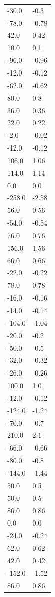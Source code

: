 \begin{longtable}{ll}
-30.0 & -0.3 \\
-78.0 & -0.78 \\
42.0 & 0.42 \\
10.0 & 0.1 \\
-96.0 & -0.96 \\
-12.0 & -0.12 \\
-62.0 & -0.62 \\
80.0 & 0.8 \\
36.0 & 0.36 \\
22.0 & 0.22 \\
-2.0 & -0.02 \\
-12.0 & -0.12 \\
106.0 & 1.06 \\
114.0 & 1.14 \\
0.0 & 0.0 \\
-258.0 & -2.58 \\
56.0 & 0.56 \\
-54.0 & -0.54 \\
76.0 & 0.76 \\
156.0 & 1.56 \\
66.0 & 0.66 \\
-22.0 & -0.22 \\
78.0 & 0.78 \\
-16.0 & -0.16 \\
-14.0 & -0.14 \\
-104.0 & -1.04 \\
-20.0 & -0.2 \\
-50.0 & -0.5 \\
-32.0 & -0.32 \\
-26.0 & -0.26 \\
100.0 & 1.0 \\
-12.0 & -0.12 \\
-124.0 & -1.24 \\
-70.0 & -0.7 \\
210.0 & 2.1 \\
-66.0 & -0.66 \\
-80.0 & -0.8 \\
-144.0 & -1.44 \\
50.0 & 0.5 \\
50.0 & 0.5 \\
86.0 & 0.86 \\
0.0 & 0.0 \\
-24.0 & -0.24 \\
62.0 & 0.62 \\
42.0 & 0.42 \\
-152.0 & -1.52 \\
86.0 & 0.86 \\

\end{longtable}
